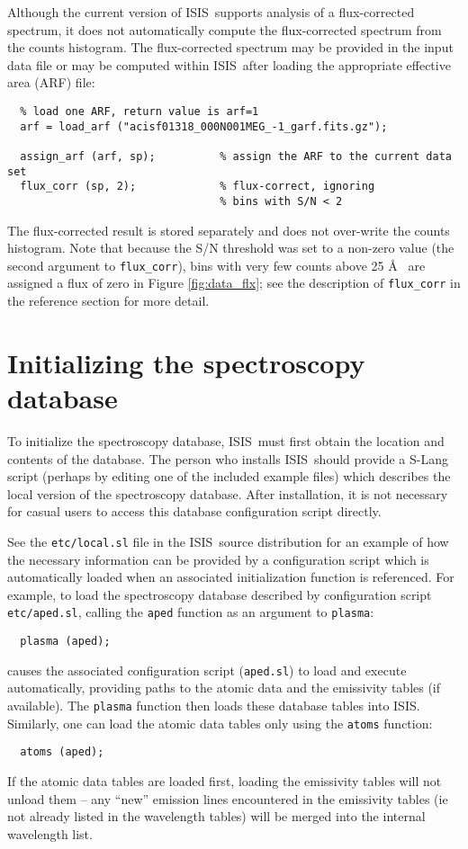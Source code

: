 \documentclass{book}
\newcommand{\isisx}{{\sc ISIS~}}
\newcommand{\isis}{{\sc ISIS}}
\begin{document}
Although the current version of \isisx supports analysis of a flux-corrected
spectrum, it does not automatically compute the flux-corrected spectrum from
the counts histogram. The flux-corrected spectrum may be provided in the
input data file or may be computed within \isisx after loading the
appropriate effective area (ARF) file:
\begin{verbatim}
  % load one ARF, return value is arf=1
  arf = load_arf ("acisf01318_000N001MEG_-1_garf.fits.gz");

  assign_arf (arf, sp);          % assign the ARF to the current data set
  flux_corr (sp, 2);             % flux-correct, ignoring
                                 % bins with S/N < 2
\end{verbatim}
The flux-corrected result is stored separately and does not over-write
the counts histogram. Note that because the S/N threshold was set to a
non-zero value (the second argument to {\tt flux\_corr}), bins with
very few counts above 25 \AA~ are assigned a flux of zero in Figure
\ref{fig:data_flx};  see the
description of {\tt flux\_corr} in the reference section for more detail.

\section{Initializing the spectroscopy database}
\label{specdb-init}

To initialize the spectroscopy database, \isisx must first obtain
the location and contents of the database.  The person who
installs \isisx should provide a S-Lang script (perhaps by editing
one of the included example files) which describes the local
version of the spectroscopy database.  After installation, it is
not necessary for casual users to access this database
configuration script directly.

See the {\tt etc/local.sl} file in the \isisx source distribution for
an example of how the necessary information can be provided by a
configuration script which is automatically loaded when an
associated initialization function is referenced.  For example, to
load the spectroscopy database described by configuration script
{\tt etc/aped.sl}, calling the {\tt aped} function as an argument to
{\tt plasma}:
 \begin{verbatim}
  plasma (aped);
 \end{verbatim}
causes the associated configuration script ({\tt aped.sl}) to load
and execute automatically, providing paths to
the atomic data and the emissivity tables (if available).
The {\tt plasma} function then loads these database tables into
\isis.
Similarly, one can load the atomic data tables only using the
{\tt atoms} function:
\begin{verbatim}
  atoms (aped);
 \end{verbatim}
If the atomic data tables are loaded first, loading the emissivity
tables will not unload them -- any ``new'' emission lines
encountered in the emissivity tables (ie not already listed in the
wavelength tables) will be merged into the internal wavelength
list.
\end{document}

